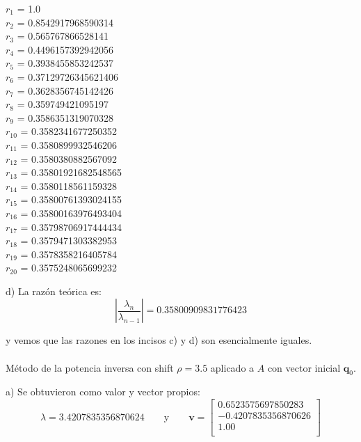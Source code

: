 \documentclass[11pt]{article}
\begin{document}
\begin{multicols}{3}
\noindent
$ r_{1} $ = 1.0 \\
$ r_{2} $ = 0.8542917968590314 \\
$ r_{3} $ = 0.565767866528141 \\
$ r_{4} $ = 0.4496157392942056 \\
$ r_{5} $ = 0.3938455853242537 \\
$ r_{6} $ = 0.37129726345621406 \\
$ r_{7} $ = 0.3628356745142426 \\
$ r_{8} $ = 0.359749421095197 \\
$ r_{9} $ = 0.3586351319070328 \\
$ r_{10} $ = 0.3582341677250352 \\
$ r_{11} $ = 0.3580899932546206 \\
$ r_{12} $ = 0.3580380882567092 \\
$ r_{13} $ = 0.35801921682548565 \\
$ r_{14} $ = 0.3580118561159328 \\
$ r_{15} $ = 0.35800761393024155 \\
$ r_{16} $ = 0.35800163976493404 \\
$ r_{17} $ = 0.35798706917444434 \\
$ r_{18} $ = 0.3579471303382953 \\
$ r_{19} $ = 0.3578358216405784 \\
$ r_{20} $ = 0.3575248065699232 \\
\end{multicols}



d) La razón teórica es:
$$
\left| \frac{\lambda_n}{\lambda_{n-1}} \right| = 0.35800909831776423
$$

y vemos que las razones en los incisos c) y d) son esencialmente iguales.
\\
\\

\noindent
Método de la potencia inversa con shift $\rho = 3.5$ aplicado a $A$ con vector inicial $\textbf{q}_0$.

a) Se obtuvieron como valor y vector propios:
 \[
 \lambda = 3.4207835356870624
 \qquad\text{y}\qquad
 \textbf{v} = \begin{bmatrix}
0.6523575697850283 \\
-0.4207835356870626\\
1.00 \\
\end{bmatrix}
 \]
 \\
 \\
\end{document}
